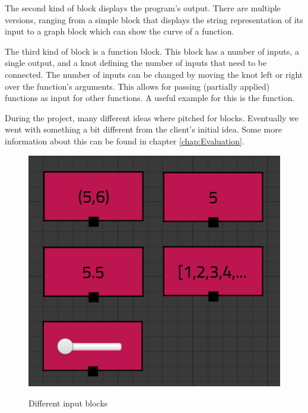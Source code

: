 The second kind of block displays the program's output. 
There are multiple versions, ranging from a simple block that displays the string representation of its input to a graph block which can show the curve of a function. 

The third kind of block is a function block. This block has a number of inputs, a single output, and a knot defining the number of inputs that need to be connected. 
The number of inputs can be changed by moving the knot left or right over the function's arguments.
This allows for passing (partially applied) functions as input for other functions. 
A useful example for this is the  function.

During the project, many different ideas where pitched for blocks. Eventually we went with something a bit different from the client's initial idea. Some more information about this can be found in chapter \ref{chap:Evaluation}.

\begin{figure}[p]
	\centering
	\includegraphics[scale=0.5]{Images/blocks-inputs}
	\label{fig:blocks-inputs}
	\caption{Different input blocks}
\end{figure}

